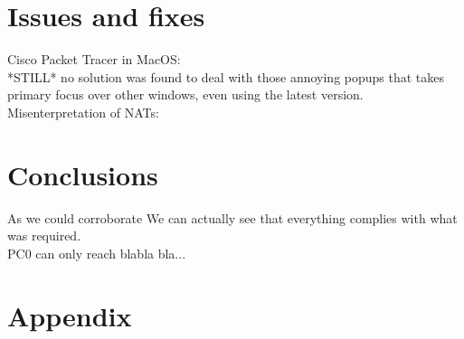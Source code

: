 \documentclass[11pt,a4paper]{report}
\begin{document}
        

        

        

        

        

\chapter{Issues and fixes}
    Cisco Packet Tracer in MacOS:\\
        \hspace*{10mm}*STILL* no solution was found to deal with those annoying popups that takes primary focus over other windows, even using the latest version.\\
    Misenterpretation of NATs:\\
        \hspace*{10mm}%

\chapter{Conclusions}
    As we could corroborate
    We can actually see that everything complies with what was required.\\
    PC0 can only reach blabla bla...%

%
%

\appendix
\chapter{Appendix}
\end{document}
